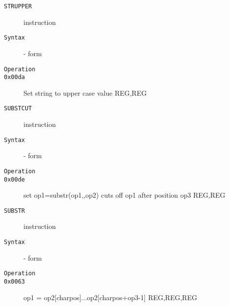 \clearpage
\begin{description}
\item[\texttt{STRUPPER}] instruction\\
\item[\texttt{Syntax}] - form \\

\item[\texttt{Operation}]
\item[\texttt{}]
\item[\texttt{0x00da}] Set string to upper case value  {REG,REG}           \\
\end{description}
\clearpage
\begin{description}
\item[\texttt{SUBSTCUT}] instruction\\
\item[\texttt{Syntax}] - form \\

\item[\texttt{Operation}]
\item[\texttt{}]
\item[\texttt{0x00de}] set op1=substr(op1,,op2) cuts off op1 after position op3  {REG,REG}           \\
\end{description}
\clearpage
\begin{description}
\item[\texttt{SUBSTR}] instruction\\
\item[\texttt{Syntax}] - form \\

\item[\texttt{Operation}]
\item[\texttt{}]
\item[\texttt{0x0063}] op1 = op2[charpos]...op2[charpos+op3-1]  {REG,REG,REG}       \\
\end{description}
